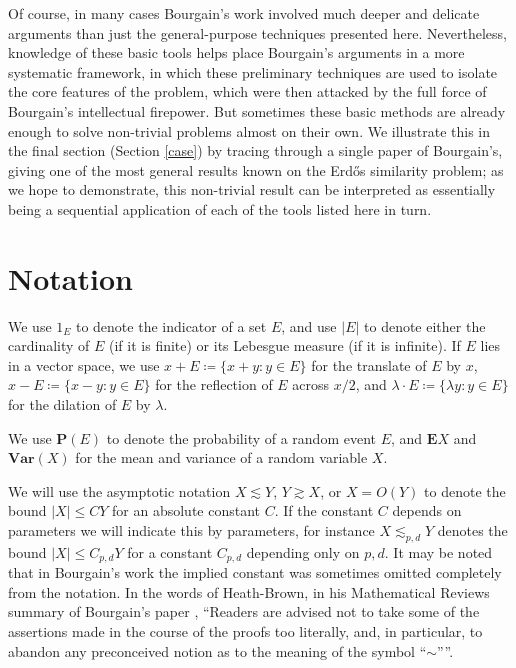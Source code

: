 \documentclass[12pt,a4paper,reqno]{amsart}
\numberwithin{equation}{section}
\theoremstyle{plain}
\theoremstyle{definition}
\newcommand\E{\mathbf{E}}
\renewcommand\P{\mathbf{P}}
\newcommand\Var{\mathbf{Var}}
\begin{document}
Of course, in many cases Bourgain's work involved much deeper and delicate arguments than just the general-purpose techniques presented here.  Nevertheless, knowledge of these basic tools helps place Bourgain's arguments in a more systematic framework, in which these preliminary techniques are used to isolate the core features of the problem, which were then attacked by the full force of Bourgain's intellectual firepower.  But sometimes these basic methods are already enough to solve non-trivial problems almost on their own.  We illustrate this in the final section (Section \ref{case}) by tracing through a single paper \cite{similarity} of Bourgain's, giving one of the most general results known on the Erd\H{o}s similarity problem; as we hope to demonstrate, this non-trivial result can be interpreted as essentially being a sequential application of each of the tools listed here in turn.


\section{Notation}

We use $1_E$ to denote the indicator of a set $E$, and use $|E|$ to denote either the cardinality of $E$ (if it is finite) or its Lebesgue measure (if it is infinite).  If $E$ lies in a vector space, we use $x+E \coloneqq \{ x+y: y \in E \}$ for the translate of $E$ by $x$, $x - E \coloneqq  \{ x-y: y \in E \}$ for the reflection of $E$ across $x/2$, and $\lambda \cdot E \coloneqq  \{ \lambda y: y \in E \}$ for the dilation of $E$ by $\lambda$.

We use $\P(E)$ to denote the probability of a random event $E$, and $\E X$ and $\Var(X)$ for the mean and variance of a random variable $X$.

We will use the asymptotic notation $X \lesssim Y$, $Y \gtrsim X$, or $X = O(Y)$ to denote the bound $|X| \leq CY$ for an absolute constant $C$. If the constant $C$ depends on parameters we will indicate this by parameters, for instance $X \lesssim_{p,d} Y$ denotes the bound $|X| \leq C_{p,d} Y$ for a constant $C_{p,d}$ depending only on $p,d$.  It may be noted that in Bourgain's work the implied constant was sometimes omitted completely from the notation.  In the words of Heath-Brown, in his Mathematical Reviews summary of Bourgain's paper \cite{dirichlet},
``Readers are advised not to take some of the assertions made in the course of the proofs too literally, and, in particular, to abandon any preconceived notion as to the meaning of the symbol ``$\sim$''''.
\end{document}
